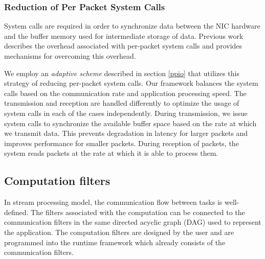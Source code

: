 \documentclass[10pt, conference, compsocconf, reqno]{IEEEtran}
\newcommand{\comment}[1]{}
\begin{document}
\subsubsection{Reduction of Per Packet System Calls}

System calls are required in order to synchronize data between the NIC hardware and the buffer memory used for intermediate storage of data. Previous work describes the overhead associated with per-packet system calls and provides mechanisms for overcoming this overhead\cite{1564468}\cite{Han:2010:PGS:1851275.1851207}\cite{Rizzo:2012:RNI:2090147.2103536}.

We employ an \textit{adaptive scheme} described in section \ref{ppio} that utilizes this strategy of reducing per-packet system calls. Our framework balances the system calls based on the communication rate and application processing speed. The transmission and reception are handled differently to optimize the usage of system calls in each of the cases independently. During transmission, we issue system calls to synchronize the available buffer space based on the rate at which we transmit data. This prevents degradation in latency for larger packets and improves performance for smaller packets. During reception of packets, the system reads packets at the rate at which it is able to process them.

\subsection{Computation filters}

\comment{Computation filters represents the operations associated . The subset of the application that we are interested in parallelizing is the stream processing component.} In stream processing model, the communication flow between tasks is well-defined. \comment{This is usually represented by a synchronous data flow graph (SDF).} The filters associated with the computation can be connected to the communication filters in the same directed acyclic graph (DAG) used to represent the application. \comment{The packet processing tasks operate on packets and the application tasks operate on the data. Since we focus more on parallel packet processing, optimizations in relation to the application graph are not discussed. It is assumed that a static version of the application graph is available and we focus more on executing these tasks in parallel with the packet processing tasks.} The computation filters are designed by the user and are programmed into the runtime framework which already consists of the communication filters.
\end{document}
